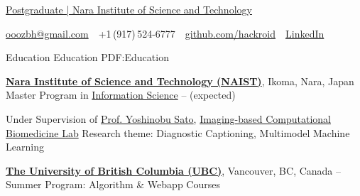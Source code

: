 \documentclass[a4paper,MMMyyyy,nonstopmode]{simpleresumecv}
\newcommand{\CVAuthor}{Bohong ZHAO}
\begin{document}

\Title{\CVAuthor}

\begin{SubTitle}
    \href{http://www.naist.jp/en/}
    {Postgraduate | Nara Institute of Science and Technology}
    \par
    \href{mailto:ooozbh@gmail.com}
    {ooozbh@gmail.com}
    \,\SubBulletSymbol\,
    +1\,(917)\,524-6777
    \,\SubBulletSymbol\,
    \href{https://github.com/hackroid/}{github.com/hackroid}
    \,\SubBulletSymbol\,
    \href{https://www.linkedin.com/in/%E5%8D%9A%E5%BC%98-%E8%B5%B5-b7ab09136/}{LinkedIn}
\end{SubTitle}

\begin{Body}


    \Section
    {Education}
    {Education}
    {PDF:Education}

    \Entry
    \href{http://www.naist.jp/en/}
    {\textbf{Nara Institute of Science and Technology (NAIST)}},
    Ikoma, Nara, Japan
    \Gap
    \BulletItem
    Master Program in
    \href{http://isw3.naist.jp/home-en.html}
    {Information Science}
    \hfill
     --
     (expected)
    \begin{Detail}
        \SubBulletItem
        Under Supervision of \href{http://icb-lab.naist.jp/members/yoshi/index.html}{Prof. Yoshinobu Sato}, \href{http://icb-lab.naist.jp/index.html}{Imaging-based Computational Biomedicine Lab}
        \SubBulletItem
        Research theme: Diagnostic Captioning, Multimodel Machine Learning
    \end{Detail}

    \Gap

    \Entry
    \href{https://www.ubc.ca/}
    {\textbf{The University of British Columbia (UBC)}},
    Vancouver, BC, Canada
    \hfill
     --
    \BulletItem
    Summer Program: Algorithm \& Webapp Courses

    \Gap


\end{Body}
\end{document}

